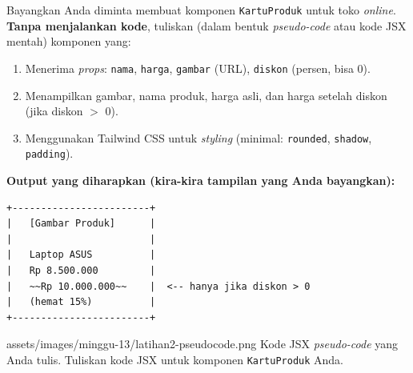 \begin{latihan}
Bayangkan Anda diminta membuat komponen \texttt{KartuProduk} untuk toko \emph{online}. \textbf{Tanpa menjalankan kode}, tuliskan (dalam bentuk \emph{pseudo-code} atau kode JSX mentah) komponen yang:
\begin{enumerate}
  \item Menerima \emph{props}: \texttt{nama}, \texttt{harga}, \texttt{gambar} (URL), \texttt{diskon} (persen, bisa 0).
  \item Menampilkan gambar, nama produk, harga asli, dan harga setelah diskon (jika diskon $>$ 0).
  \item Menggunakan Tailwind CSS untuk \emph{styling} (minimal: \texttt{rounded}, \texttt{shadow}, \texttt{padding}).
\end{enumerate}

\textbf{Output yang diharapkan (kira-kira tampilan yang Anda bayangkan):}

\begin{lstlisting}
+------------------------+
|   [Gambar Produk]      |
|                        |
|   Laptop ASUS          |
|   Rp 8.500.000         |
|   ~~Rp 10.000.000~~    |  <-- hanya jika diskon > 0
|   (hemat 15%)          |
+------------------------+
\end{lstlisting}

\begin{tangkapanlayar}
  {assets/images/minggu-13/latihan2-pseudocode.png}
  {Kode JSX \emph{pseudo-code} yang Anda tulis.}
  {Tuliskan kode JSX untuk komponen \texttt{KartuProduk} Anda.}
\end{tangkapanlayar}
\end{latihan}

